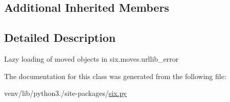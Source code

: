 \subsection*{Additional Inherited Members}


\subsection{Detailed Description}
\begin{DoxyVerb}Lazy loading of moved objects in six.moves.urllib_error\end{DoxyVerb}
 

The documentation for this class was generated from the following file\+:\begin{DoxyCompactItemize}
\item 
venv/lib/python3./site-\/packages/\hyperlink{six_8py}{six.\+py}\end{DoxyCompactItemize}
